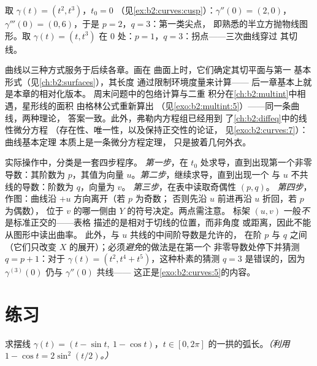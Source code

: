 \begin{example}
取 $\gamma(t) = (t^2, t^3)$，$t_0 = 0$
（见\cref{ex:b2:curves:cusp}）：$\gamma'' (0)= (2, 0)$，$\gamma'''(0) =
(0, 6)$，于是 $p = 2$，$q = 3$：第一类尖点，
即熟悉的半立方抛物线图形。取 $\gamma(t) = (t,
t^3)$ 在 $0$ 处：$p = 1$，$q = 3$：拐点——三次曲线穿过
其切线。
\end{example}

\begin{remark}[本册内的展望]
曲线以三种方式服务于后续各章。画在
曲面上时，它们确定其切平面与第一
基本形式（见\cref{ch:b2:surfaces}），其长度
通过限制环境度量来计算——
后一章基本上就是本章的相对化版本。
周末问题中的包络计算与二重
积分在\cref{ch:b2:multint}中相遇，星形线的面积
由格林公式重新算出
（见\cref{exo:b2:multint:5}）——同一条曲线，两种理论，
答案一致。此外，弗勒内方程组已经用到
了\cref{ch:b2:diffeq}中的线性微分方程
（存在性、唯一性，以及保持正交性的论证，
见\cref{exo:b2:curves:7}）：曲线基本定理
本质上是一条微分方程定理，
只是披着几何外衣。
\end{remark}

\begin{remark}[方法：局部分析的步骤]
实际操作中，分类是一套四步程序。
\emph{第一步}，在 $t_0$ 处求导，直到出现第一个非零
导数：其阶数为 $p$，其值为向量
$u$。\emph{第二步}，继续求导，直到出现一个
与 $u$ 不共线的导数：阶数为 $q$，向量为 $v$。
\emph{第三步}，在表中读取奇偶性 $(p, q)$。
\emph{第四步}，作图：曲线沿 $+u$ 方向离开（若 $p$ 为奇数；
否则先沿 $u$ 前进再沿 $u$ 折回，若 $p$ 为偶数），
位于 $v$ 的哪一侧由 $Y$ 的符号决定。两点需注意。
标架 $(u, v)$ 一般\emph{不}是标准正交的——表格
描述的是相对于切线的位置，而非角度
或距离，因此不能从图形中读出曲率。
此外，与 $u$ 共线的中间阶导数是允许的，
在阶 $p$ 与 $q$ 之间（它们只改变
$X$ 的展开）；必须\emph{避免}的做法是在第一个
非零导数处停下并猜测 $q = p + 1$：对于 $\gamma(t)
= (t^2, t^4 + t^5)$，这种朴素的猜测 $q = 3$ 是错误的，因为
$\gamma^{(3)}(0)$ 仍与 $\gamma''(0)$ 共线——
这正是\cref{exo:b2:curves:5}的内容。
\end{remark}

\section{练习}

\begin{exercise}[$\star$]\label{exo:b2:curves:1}
求摆线 $\gamma(t) = (t -
\sin t,\ 1 - \cos t)$，$t \in [0, 2\pi]$ 的一拱的弧长。\emph{（利用 $1 - \cos t =
2\sin^2(t/2)$。）}
\end{exercise}

